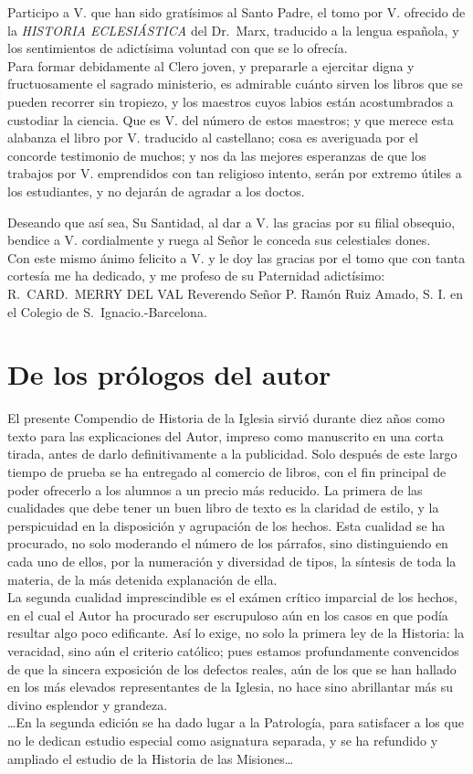 \raggedbottom{} \documentclass[12pt, a4paper, openany]{book} %
\begin{document}
Participo a V. que han sido gratísimos al Santo Padre, el tomo por V. ofrecido de la \textit{HISTORIA ECLESIÁSTICA} del Dr.\ Marx, traducido a la lengua española, y los sentimientos de adictísima voluntad con que se lo ofrecía.\\
Para formar debidamente al Clero joven, y prepararle a ejercitar digna y fructuosamente el sagrado ministerio, es admirable cuánto sirven los libros que se pueden recorrer sin tropiezo, y los maestros cuyos labios están acostumbrados a custodiar la ciencia. Que es V. del número de estos maestros; y que merece esta alabanza el libro por V. traducido al castellano; cosa es averiguada por el concorde testimonio de muchos; y nos da las mejores esperanzas de que los trabajos por V. emprendidos con tan religioso intento, serán por extremo útiles a los estudiantes, y no dejarán de agradar a los doctos.

Deseando que así sea, Su Santidad, al dar a V. las gracias por su filial obsequio, bendice a V. cordialmente y ruega al Señor le conceda sus celestiales dones.\\
Con este mismo ánimo felicito a V. y le doy las gracias por el tomo que con tanta cortesía me ha dedicado, y me profeso de su Paternidad adictísimo:\\
R.\ CARD.\ MERRY DEL VAL
Reverendo Señor P. Ramón Ruiz Amado, S. I. en el Colegio de S.\ Ignacio.\@ -Barcelona.
\section{De los prólogos del autor}
El presente Compendio de Historia de la Iglesia sirvió durante diez años como texto para las explicaciones del Autor, impreso como manuscrito en una corta tirada, antes de darlo definitivamente a la publicidad. Solo después de este largo tiempo de prueba se ha entregado al comercio de libros, con el fin principal de poder ofrecerlo a los alumnos a un precio más reducido. La primera de las cualidades que debe tener un buen libro de texto es la claridad de estilo, y la perspicuidad en la disposición y agrupación de los hechos. Esta cualidad se ha procurado, no solo moderando el número de los párrafos, sino distinguiendo en cada uno de ellos, por la numeración y diversidad de tipos, la síntesis de toda la materia, de la más detenida explanación de ella.\\
La segunda cualidad imprescindible es el exámen crítico imparcial de los hechos, en el cual el Autor ha procurado ser escrupuloso aún en los casos en que podía resultar algo poco edificante. Así lo exige, no solo la primera ley de la Historia: la veracidad, sino aún el criterio católico; pues estamos profundamente convencidos de que la sincera exposición de los defectos reales, aún de los que se han hallado en los más elevados representantes de la Iglesia, no hace sino abrillantar más su divino esplendor y grandeza.\\
\ldots En la segunda edición se ha dado lugar a la Patrología, para satisfacer a los que no le dedican estudio especial como asignatura separada, y se ha refundido y ampliado el estudio de la Historia de las Misiones\ldots
\end{document}
